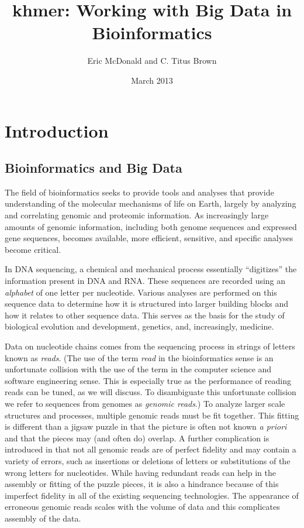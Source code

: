 \documentclass{article}
\title{khmer: Working with Big Data in Bioinformatics}
\author{Eric McDonald and C. Titus Brown}
\date{March 2013}
\begin{document}
\maketitle

\section{Introduction}

\subsection{Bioinformatics and Big Data}

The field of bioinformatics seeks to provide tools and analyses that
provide understanding of the molecular mechanisms of life on Earth,
largely by analyzing and correlating genomic and proteomic information.
As increasingly large amounts of genomic information, including both
genome sequences and expressed gene sequences, becomes available,
more efficient, sensitive, and specific analyses become critical.

In DNA sequencing, a chemical and mechanical process essentially
``digitizes'' the information present in DNA and RNA. These sequences
are recorded using an \textit{alphabet} of one letter per
nucleotide. Various analyses are performed on this sequence data to
determine how it is structured into larger building blocks and how it
relates to other sequence data. This serves as the basis for the study
of biological evolution and development, genetics, and, increasingly,
medicine.

Data on nucleotide chains comes from the sequencing process in strings of
letters known as \textit{reads}. (The use of the term \textit{read} in the
bioinformatics sense is an unfortunate collision with the use of the term in
the computer science and software engineering sense. This is especially true as
the performance of reading reads can be tuned, as we will discuss. To
disambiguate this unfortunate collision we refer to sequences from genomes as
\textit{genomic reads}.) To analyze larger scale structures and processes,
multiple genomic reads must be fit together. This fitting is different than a
jigsaw puzzle in that the picture is often not known \textit{a priori} and that
the pieces may (and often do) overlap. A further complication is introduced in
that not all genomic reads are of perfect fidelity and may contain a variety of
errors, such as insertions or deletions of letters or substitutions of the
wrong letters for nucleotides. While having redundant reads can help in the
assembly or fitting of the puzzle pieces, it is also a hindrance because of
this imperfect fidelity in all of the existing sequencing technologies. The
appearance of erroneous genomic reads scales with the volume of data and this
complicates assembly of the data.
\end{document}
